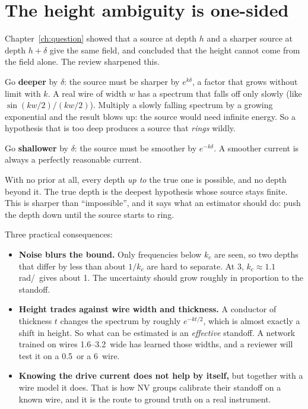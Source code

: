 \section{The height ambiguity is one-sided}

Chapter~\ref{ch:question} showed that a source at depth $h$ and a sharper source at depth $h+\delta$ give the same
field, and concluded that the height cannot come from the field alone. The review sharpened this.

Go \textbf{deeper} by $\delta$: the source must be sharper by $e^{k\delta}$, a factor that grows without limit with $k$.
A real wire of width $w$ has a spectrum that falls off only slowly (like $\sin(kw/2)/(kw/2)$). Multiply a slowly falling
spectrum by a growing exponential and the result blows up: the source would need infinite energy. So a hypothesis that
is too deep produces a source that \emph{rings} wildly.

Go \textbf{shallower} by $\delta$: the source must be smoother by $e^{-k\delta}$. A smoother current is always a perfectly
reasonable current.

\begin{keyidea}
With no prior at all, every depth \emph{up to} the true one is possible, and no depth beyond it. The true depth is the
deepest hypothesis whose source stays finite. This is sharper than ``impossible'', and it says what an estimator
should do: push the depth down until the source starts to ring.
\end{keyidea}

Three practical consequences:
\begin{itemize}
\item \textbf{Noise blurs the bound.} Only frequencies below $k_c$ are seen, so two depths that differ by less than about
$1/k_c$ are hard to separate. At 3\um, $k_c\approx1.1$\,rad/\um\ gives about 1\um. The uncertainty should grow roughly in
proportion to the standoff.
\item \textbf{Height trades against wire width and thickness.} A conductor of thickness $t$ changes the spectrum by
roughly $e^{-kt/2}$, which is almost exactly a shift in height. So what can be estimated is an \emph{effective}
standoff. A network trained on wires 1.6--3.2\um\ wide has learned those widths, and a reviewer will test it on a
0.5\um\ or a 6\um\ wire.
\item \textbf{Knowing the drive current does not help by itself,} but together with a wire model it does. That is how NV
groups calibrate their standoff on a known wire, and it is the route to ground truth on a real instrument.
\end{itemize}

